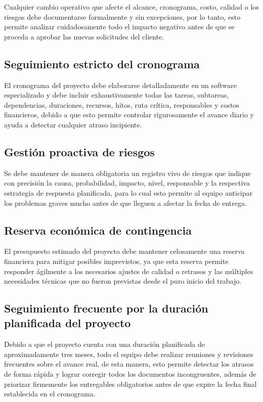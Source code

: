 \documentclass[11pt,spanish]{article}
\begin{document}
Cualquier cambio operativo que afecte el alcance, cronograma, costo, calidad o los riesgos debe documentarse formalmente y sin excepciones, por lo tanto, esto permite analizar cuidadosamente todo el impacto negativo antes de que se proceda a aprobar las nuevas solicitudes del cliente.

\subsection{Seguimiento estricto del cronograma}

El cronograma del proyecto debe elaborarse detalladamente en un software especializado y debe incluir exhaustivamente todas las tareas, subtareas, dependencias, duraciones, recursos, hitos, ruta crítica, responsables y costos financieros, debido a que esto permite controlar rigurosamente el avance diario y ayuda a detectar cualquier atraso incipiente.

\subsection{Gestión proactiva de riesgos}

Se debe mantener de manera obligatoria un registro vivo de riesgos que indique con precisión la causa, probabilidad, impacto, nivel, responsable y la respectiva estrategia de respuesta planificada, para lo cual esto permite al equipo anticipar los problemas graves mucho antes de que lleguen a afectar la fecha de entrega.

\subsection{Reserva económica de contingencia}

El presupuesto estimado del proyecto debe mantener celosamente una reserva financiera para mitigar posibles imprevistos, ya que esta reserva permite responder ágilmente a los necesarios ajustes de calidad o retrasos y las múltiples necesidades técnicas que no fueron previstas desde el puro inicio del trabajo.

\subsection{Seguimiento frecuente por la duración planificada del proyecto}

Debido a que el proyecto cuenta con una duración planificada de aproximadamente tres meses, todo el equipo debe realizar reuniones y revisiones frecuentes sobre el avance real, de esta manera, esto permite detectar los atrasos de forma rápida y lograr corregir todos los documentos incongruentes, además de priorizar firmemente los entregables obligatorios antes de que expire la fecha final establecida en el cronograma.
\end{document}
